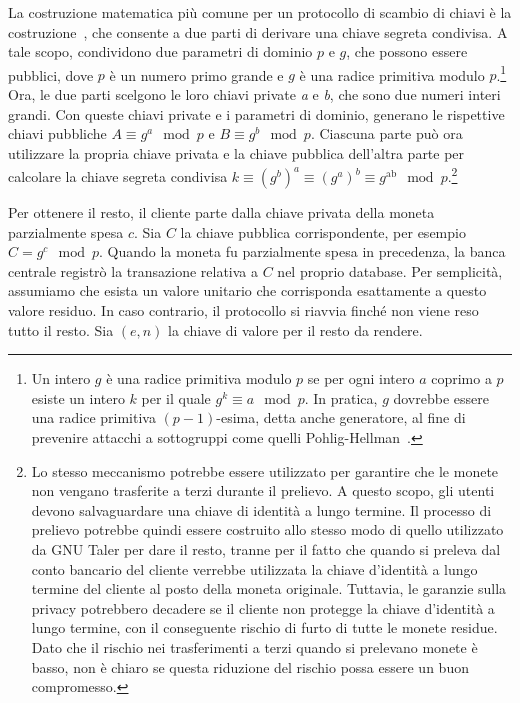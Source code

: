 \documentclass{article}
\begin{document}
La costruzione matematica più comune per un protocollo di scambio di
chiavi è la costruzione~\cite{Diffie}, che
consente a due parti di derivare una chiave segreta condivisa. A tale
scopo, condividono due parametri di dominio $p$ e $g$, che possono
essere pubblici, dove $p$ è un numero primo grande e $g$ è una radice
primitiva modulo $p$.\footnote{Un intero $g$ è una radice primitiva
modulo $p$ se per ogni intero $a$ coprimo a $p$ esiste un intero $k$
per il quale
$g^k \equiv a \mod p$.
In pratica, $g$ dovrebbe essere una radice primitiva $(p-1)$-esima, detta
anche generatore, al fine di prevenire attacchi a sottogruppi come quelli
Pohlig-Hellman~\cite[vedi][]{Lim}.} Ora, le due parti scelgono le loro
chiavi private \emph{a} e \emph{b}, che sono due numeri interi grandi.
Con queste chiavi private e i parametri di dominio, generano le
rispettive chiavi pubbliche
$A \equiv g^{a} \mod p$ e $B \equiv g^{b} \mod p$.
Ciascuna parte può ora utilizzare la propria chiave privata e la chiave
pubblica dell'altra parte per calcolare la chiave segreta condivisa
$k \equiv \left( g^b \right)^{a} \equiv \left( g^{a} \right)^{b} \equiv g^{\text{ab}} \mod p$.\footnote{
Lo stesso meccanismo potrebbe essere utilizzato per garantire
che le monete non vengano trasferite a terzi durante il prelievo. A
questo scopo, gli utenti devono salvaguardare una chiave di identità a
lungo termine. Il processo di prelievo potrebbe quindi essere
costruito allo stesso modo di quello utilizzato da GNU Taler per dare
il resto, tranne per il fatto che quando si preleva dal conto bancario
del cliente verrebbe utilizzata la chiave d'identità a lungo termine
del cliente al posto della moneta originale. Tuttavia, le garanzie
sulla privacy potrebbero decadere se il cliente non protegge la chiave
d'identità a lungo termine, con il conseguente rischio di furto di
tutte le monete residue. Dato che il rischio nei trasferimenti a terzi
quando si prelevano monete è basso, non è chiaro se questa riduzione
del rischio possa essere un buon compromesso.}

Per ottenere il resto, il cliente parte dalla chiave privata della
moneta parzialmente spesa $c$. Sia $C$ la chiave pubblica corrispondente,
per esempio
$C = g^{c} \mod p$.
Quando la moneta fu parzialmente spesa in precedenza, la banca centrale
registrò la transazione relativa a $C$ nel proprio database. Per
semplicità, assumiamo che esista un valore unitario che corrisponda
esattamente a questo valore residuo. In caso contrario, il protocollo si
riavvia finché non viene reso tutto il resto. Sia $(e,n)$ la
chiave di valore per il resto da rendere.
\end{document}
